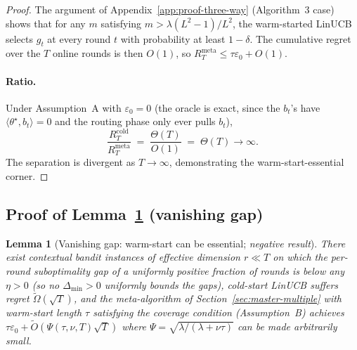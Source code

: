 \documentclass{article}
\newtheorem{lemma}{Lemma}
\theoremstyle{definition}
\theoremstyle{remark}
\theoremstyle{remark}
\begin{document}
\begin{proof}
The argument of Appendix~\ref{app:proof-three-way} (Algorithm~3 case)
shows that for any $m$ satisfying $m > \lambda(L^2-1)/L^2$, the
warm-started LinUCB selects $g_t$ at every round $t$ with probability
at least $1-\delta$. The cumulative regret over the $T$ online rounds
is then $O(1)$, so
$R_T^{\mathrm{meta}} \le \tau\varepsilon_0 + O(1)$.

\paragraph{Ratio.}
Under Assumption~A with $\varepsilon_0 = 0$ (the oracle is exact, since
the $b_t$'s have $\langle\theta^\star,b_t\rangle = 0$ and the routing
phase only ever pulls $b_t$),
\[
\frac{R_T^{\mathrm{cold}}}{R_T^{\mathrm{meta}}}
\;=\; \frac{\Theta(T)}{O(1)}
\;=\; \Theta(T) \to \infty.
\]
The separation is divergent as $T\to\infty$, demonstrating the
warm-start-essential corner.
\end{proof}

\subsection{Proof of Lemma~\ref{lem:vanishing-gap} (vanishing gap)}
\label{app:proof-vanishing-gap}

\begin{lemma}[Vanishing gap: warm-start can be essential; \emph{negative result}]
\label{lem:vanishing-gap}
There exist contextual bandit instances of effective dimension
$r\ll T$ on which the per-round suboptimality gap of a uniformly
positive fraction of rounds is below any $\eta>0$ (so no
$\Delta_{\min}>0$ uniformly bounds the gaps), cold-start LinUCB
suffers regret $\widetilde\Omega(\sqrt T)$, and the meta-algorithm
of Section~\ref{sec:master-multiple} with warm-start length $\tau$
satisfying the coverage condition (Assumption~B) achieves
$\tau\varepsilon_0+\widetilde O(\Psi(\tau,\nu,T)\sqrt T)$ where
$\Psi=\sqrt{\lambda/(\lambda+\nu\tau)}$ can be made arbitrarily small.
\end{lemma}
\end{document}
